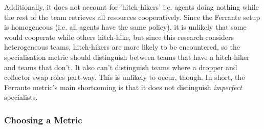 \documentclass[12pt]{article}
\begin{document}
Additionally, it does not account for 'hitch-hikers' i.e. agents doing nothing while the rest of the team retrieves all resources cooperatively. Since the Ferrante setup is homogeneous (i.e. all agents have the same policy), it is unlikely that some would cooperate while others hitch-hike, but since this research considers heterogeneous teams, hitch-hikers are more likely to be encountered, so the specialisation metric should distinguish between teams that have a hitch-hiker and teams that don't. It also can't distinguish teams where a dropper and collector swap roles part-way. This is unlikely to occur, though. In short, the Ferrante metric's main shortcoming is that it does not distinguish \textit{imperfect} specialists.

\subsubsection{Choosing a Metric}
\end{document}
